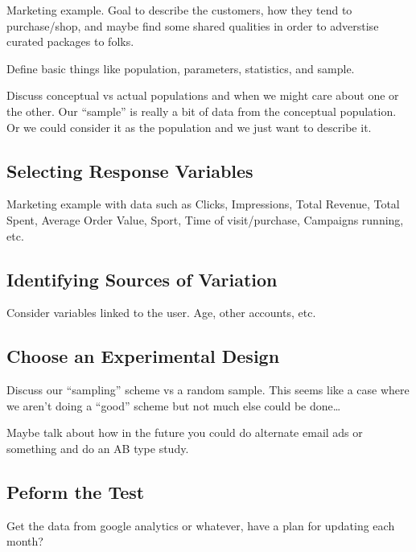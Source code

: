 \documentclass[]{book}
\begin{document}
Marketing example. Goal to describe the customers, how they tend to purchase/shop, and maybe find some shared qualities in order to adverstise curated packages to folks.

Define basic things like population, parameters, statistics, and sample.

Discuss conceptual vs actual populations and when we might care about one or the other. Our ``sample'' is really a bit of data from the conceptual population. Or we could consider it as the population and we just want to describe it.

\hypertarget{selecting-response-variables}{%
\subsection{Selecting Response Variables}\label{selecting-response-variables}}

Marketing example with data such as Clicks, Impressions, Total Revenue, Total Spent, Average Order Value, Sport, Time of visit/purchase, Campaigns running, etc.

\hypertarget{identifying-sources-of-variation}{%
\subsection{Identifying Sources of Variation}\label{identifying-sources-of-variation}}

Consider variables linked to the user. Age, other accounts, etc.

\hypertarget{choose-an-experimental-design}{%
\subsection{Choose an Experimental Design }\label{choose-an-experimental-design}}

Discuss our ``sampling'' scheme vs a random sample. This seems like a case where we aren't doing a ``good'' scheme but not much else could be done\ldots{}

Maybe talk about how in the future you could do alternate email ads or something and do an AB type study.

\hypertarget{peform-the-test}{%
\subsection{Peform the Test }\label{peform-the-test}}

Get the data from google analytics or whatever, have a plan for updating each month?
\end{document}
